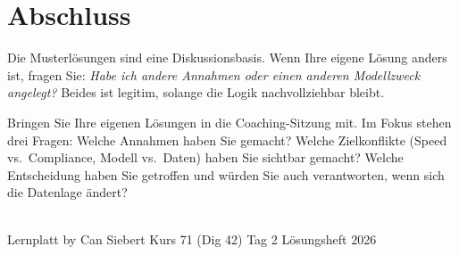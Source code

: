 \documentclass[11pt,a4paper,oneside]{article}
\begin{document}
\clearpage

\section*{Abschluss}
\thispagestyle{plain}

\noindent Die Musterl\"osungen sind eine Diskussionsbasis. Wenn Ihre eigene L\"osung anders ist, fragen Sie: \emph{Habe ich andere Annahmen \textendash{} oder einen anderen Modellzweck angelegt?} Beides ist legitim, solange die Logik nachvollziehbar bleibt.

\medskip
\begin{infobox}
Bringen Sie Ihre eigenen L\"osungen in die Coaching-Sitzung mit. Im Fokus stehen drei Fragen: Welche Annahmen haben Sie gemacht? Welche Zielkonflikte (Speed vs.\ Compliance, Modell vs.\ Daten) haben Sie sichtbar gemacht? Welche Entscheidung haben Sie getroffen \textendash{} und w\"urden Sie auch verantworten, wenn sich die Datenlage \"andert?
\end{infobox}

\vspace{1cm}
\noindent{\color{lpAccent}\rule{\linewidth}{0.6pt}}\\[4pt]
{\footnotesize\sffamily\color{lpGray}Lernplatt \textperiodcentered{} by Can Siebert \textperiodcentered{} Kurs 71 (Dig 42) \textperiodcentered{} Tag 2 \textperiodcentered{} L\"osungsheft \textperiodcentered{} \textcopyright{} 2026}
\end{document}
